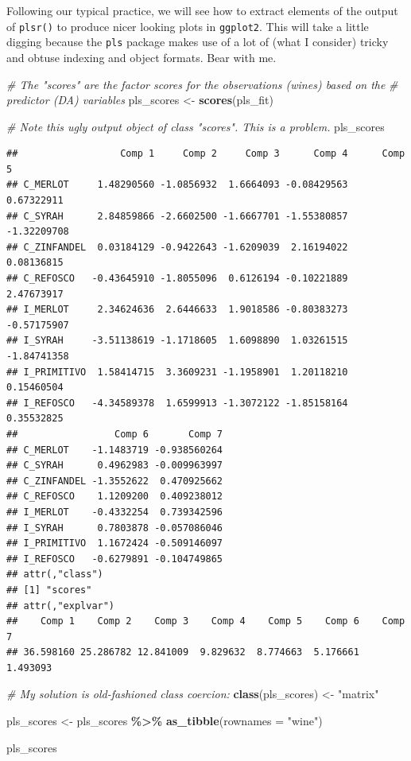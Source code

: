 \documentclass[
]{book}
\newenvironment{Shaded}{\begin{snugshade}}{\end{snugshade}}
\newcommand{\AttributeTok}[1]{\textcolor[rgb]{0.13,0.29,0.53}{#1}}
\newcommand{\CommentTok}[1]{\textcolor[rgb]{0.56,0.35,0.01}{\textit{#1}}}
\newcommand{\FunctionTok}[1]{\textcolor[rgb]{0.13,0.29,0.53}{\textbf{#1}}}
\newcommand{\NormalTok}[1]{#1}
\newcommand{\OtherTok}[1]{\textcolor[rgb]{0.56,0.35,0.01}{#1}}
\newcommand{\SpecialCharTok}[1]{\textcolor[rgb]{0.81,0.36,0.00}{\textbf{#1}}}
\newcommand{\StringTok}[1]{\textcolor[rgb]{0.31,0.60,0.02}{#1}}
\begin{document}
Following our typical practice, we will see how to extract elements of the output of \texttt{plsr()} to produce nicer looking plots in \texttt{ggplot2}. This will take a little digging because the \texttt{pls} package makes use of a lot of (what I consider) tricky and obtuse indexing and object formats. Bear with me.

\begin{Shaded}
\begin{Highlighting}[]
\CommentTok{\# The "scores" are the factor scores for the observations (wines) based on the}
\CommentTok{\# predictor (DA) variables}
\NormalTok{pls\_scores }\OtherTok{\textless{}{-}} \FunctionTok{scores}\NormalTok{(pls\_fit)}

\CommentTok{\# Note this ugly output object of class "scores".  This is a problem.}
\NormalTok{pls\_scores}
\end{Highlighting}
\end{Shaded}

\begin{verbatim}
##                  Comp 1     Comp 2     Comp 3      Comp 4      Comp 5
## C_MERLOT     1.48290560 -1.0856932  1.6664093 -0.08429563  0.67322911
## C_SYRAH      2.84859866 -2.6602500 -1.6667701 -1.55380857 -1.32209708
## C_ZINFANDEL  0.03184129 -0.9422643 -1.6209039  2.16194022  0.08136815
## C_REFOSCO   -0.43645910 -1.8055096  0.6126194 -0.10221889  2.47673917
## I_MERLOT     2.34624636  2.6446633  1.9018586 -0.80383273 -0.57175907
## I_SYRAH     -3.51138619 -1.1718605  1.6098890  1.03261515 -1.84741358
## I_PRIMITIVO  1.58414715  3.3609231 -1.1958901  1.20118210  0.15460504
## I_REFOSCO   -4.34589378  1.6599913 -1.3072122 -1.85158164  0.35532825
##                 Comp 6       Comp 7
## C_MERLOT    -1.1483719 -0.938560264
## C_SYRAH      0.4962983 -0.009963997
## C_ZINFANDEL -1.3552622  0.470925662
## C_REFOSCO    1.1209200  0.409238012
## I_MERLOT    -0.4332254  0.739342596
## I_SYRAH      0.7803878 -0.057086046
## I_PRIMITIVO  1.1672424 -0.509146097
## I_REFOSCO   -0.6279891 -0.104749865
## attr(,"class")
## [1] "scores"
## attr(,"explvar")
##    Comp 1    Comp 2    Comp 3    Comp 4    Comp 5    Comp 6    Comp 7 
## 36.598160 25.286782 12.841009  9.829632  8.774663  5.176661  1.493093
\end{verbatim}

\begin{Shaded}
\begin{Highlighting}[]
\CommentTok{\# My solution is old{-}fashioned class coercion: }
\FunctionTok{class}\NormalTok{(pls\_scores) }\OtherTok{\textless{}{-}} \StringTok{"matrix"}

\NormalTok{pls\_scores }\OtherTok{\textless{}{-}} 
\NormalTok{  pls\_scores }\SpecialCharTok{\%\textgreater{}\%} 
  \FunctionTok{as\_tibble}\NormalTok{(}\AttributeTok{rownames =} \StringTok{"wine"}\NormalTok{)}

\NormalTok{pls\_scores}
\end{Highlighting}
\end{Shaded}
\end{document}
